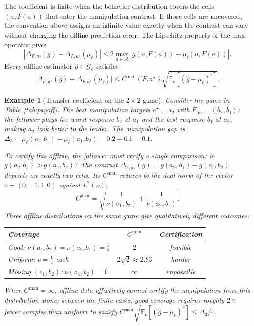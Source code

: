 \documentclass{article}
\newcommand{\cA}{\mathcal{A}}
\newcommand{\cG}{\mathcal{G}}
\newcommand{\E}{\mathbb{E}}           %
\newtheorem{example}[theorem]{Example}
\begin{document}
The coefficient is finite when the behavior distribution covers the cells $(a,F(a))$ that enter the manipulation contrast. If those cells are uncovered, the convention above assigns an infinite value exactly when the contrast can vary without changing the offline prediction error. The Lipschitz property of the max operator gives
\[
|\Delta_{F,a^\star}(g)-\Delta_{F,a^\star}(\mu_\ell)| \le
2\max_{a\in\cA}|g(a,F(a))-\mu_\ell(a,F(a))|.
\]
Every offline estimator $\widehat g\in\cG_\ell$ satisfies
\begin{equation}
\bigl|\Delta_{F,a^\star}(\widehat g)-\Delta_{F,a^\star}(\mu_\ell)\bigr|
\le C^{\mathrm{man}}(F,a^\star)\sqrt{\E_\nu[(\widehat g-\mu_\ell)^2]}.
\label{eq:transfer-ineq-fclass}
\end{equation}

\begin{example}[Transfer coefficient on the $2\times 2$ game]
Consider the game in Table~\ref{tab:payoff}. The best manipulation targets $a^\star=a_2$ with $F_{\mathrm{fm}}=(b_2,b_1)$: the follower plays the worst response $b_2$ at $a_1$ and the best response $b_1$ at $a_2$, making $a_2$ look better to the leader. The manipulation gap is $\Delta_3 = \mu_\ell(a_2,b_1)-\mu_\ell(a_1,b_2) = 0.2-0.1 = 0.1$.

To certify this offline, the follower must verify a single comparison: is $g(a_2,b_1) > g(a_1,b_2)$? The contrast $\Delta_{F,a_2}(g)=g(a_2,b_1)-g(a_1,b_2)$ depends on exactly two cells. Its $C^{\mathrm{man}}$ reduces to the dual norm of the vector $c=(0,-1,1,0)$ against $L^2(\nu)$:
\[
    C^{\mathrm{man}} = \sqrt{\frac{1}{\nu(a_1,b_2)} + \frac{1}{\nu(a_2,b_1)}}.
\]
Three offline distributions on the same game give qualitatively different outcomes:
\begin{center}
\begin{tabular}{lcc}
    Coverage & $C^{\mathrm{man}}$ & Certification \\
    \hline
    Good: $\nu(a_1,b_2)=\nu(a_2,b_1)=\tfrac{1}{2}$ & $2$ & feasible \\
    Uniform: $\nu=\tfrac{1}{4}$ each & $2\sqrt{2}\approx 2.83$ & harder \\
    Missing $(a_1,b_2)$: $\nu(a_1,b_2)=0$ & $\infty$ & impossible
\end{tabular}
\end{center}
When $C^{\mathrm{man}}=\infty$, offline data effectively cannot certify the manipulation from this distribution alone; between the finite cases, good coverage requires roughly $2\times$ fewer samples than uniform to satisfy $C^{\mathrm{man}}\sqrt{\E_\nu[(\widehat g-\mu_\ell)^2]}\le\Delta_3/4$.
\end{example}
\end{document}
